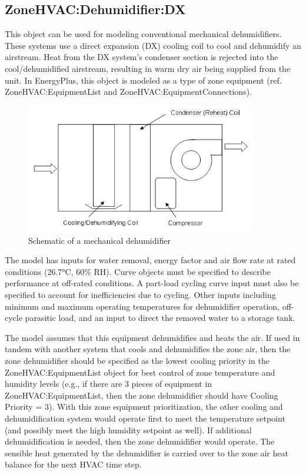 \subsection{ZoneHVAC:Dehumidifier:DX}\label{zonehvacdehumidifierdx}

This object can be used for modeling conventional mechanical dehumidifiers. These systems use a direct expansion (DX) cooling coil to cool and dehumidify an airstream. Heat from the DX system's condenser section is rejected into the cool/dehumidified airstream, resulting in warm dry air being supplied from the unit. In EnergyPlus, this object is modeled as a type of zone equipment (ref. ZoneHVAC:EquipmentList and ZoneHVAC:EquipmentConnections).

\begin{figure}[hbtp] %
\centering
\includegraphics[width=0.9\textwidth, height=0.9\textheight, keepaspectratio=true]{media/image292.png}
\caption{Schematic of a mechanical dehumidifier \protect \label{fig:schematic-of-a-mechanical-dehumidifier}}
\end{figure}

The model has inputs for water removal, energy factor and air flow rate at rated conditions (26.7°C, 60\% RH). Curve objects must be specified to describe performance at off-rated conditions. A part-load cycling curve input must also be specified to account for inefficiencies due to cycling. Other inputs including minimum and maximum operating temperatures for dehumidifier operation, off-cycle parasitic load, and an input to direct the removed water to a storage tank.

The model assumes that this equipment dehumidifies and heats the air. If used in tandem with another system that cools and dehumidifies the zone air, then the zone dehumidifier should be specified as the lowest cooling priority in the ZoneHVAC:EquipmentList object for best control of zone temperature and humidity levels (e.g., if there are 3 pieces of equipment in ZoneHVAC:EquipmentList, then the zone dehumidifier should have Cooling Priority = 3). With this zone equipment prioritization, the other cooling and dehumidification system would operate first to meet the temperature setpoint (and possibly meet the high humidity setpoint as well). If additional dehumidification is needed, then the zone dehumidifier would operate. The sensible heat generated by the dehumidifier is carried over to the zone air heat balance for the next HVAC time step.

